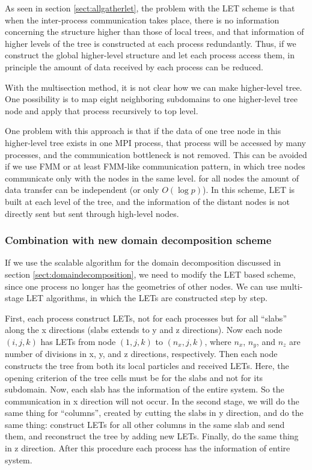 As seen in section \ref{sect:allgatherlet}, the problem with the
LET scheme is that when the inter-process communication takes place,
there is no information concerning the structure higher than those of
local trees, and that information of higher levels of the tree  is
constructed at each process redundantly. Thus, if we construct the
global higher-level structure and let each process access them, in
principle the amount of data received by each process can be reduced.

With the multisection method, it is not clear how we can make
higher-level tree. One possibility is to map eight neighboring
subdomains to one higher-level tree node and apply that process
recursively to top level.

One problem with this approach is that if the data of one tree node in
this higher-level tree exists in one MPI process, that process will be
accessed by many processes, and the communication bottleneck is not
removed. This can be avoided if we use FMM or at least FMM-like
communication pattern, in which tree nodes communicate only with the
nodes in the same level.  for all nodes the amount of data transfer
can be independent (or only $O(\log p)$). In this scheme, LET is built
at each level of the tree, and the information of the distant nodes is
not directly sent but sent through high-level nodes.

\subsubsection{Combination with new domain decomposition scheme}
\label{sect:localizedlet}
If we use the scalable algorithm for the domain decomposition
discussed in section \ref{sect:domaindecomposition},
we need to modify the LET based scheme, since one process no longer
has the geometries of other nodes. We can use multi-stage LET
algorithms, in which the LETs are constructed step by step.


First, each process construct LETs, not for each processes but for all
``slabs'' along the x directions (slabs  extends to y and z
directions). Now each node $(i,j,k)$ has LETs from node $(1, j, k)$ to
$(n_x, j, k)$, where $n_x$, $n_y$, and $n_z$ are number of divisions
in x, y, and z directions, respectively. Then each node constructs the
tree from both its local particles and received LETs. Here, the
opening criterion of the tree cells must be for the slabs and not for
its subdomain.   Now, each slab has the
information of the entire system. So the communication in x direction
will not occur. In the second stage,
we will do the same thing for ``columns'', created by cutting the
slabs in y direction, and do the same thing: construct LETs for all
other columns in the same slab and send them, and reconstruct the tree
by adding new LETs. Finally, do the same thing in z direction. After
this procedure each process has the information of entire system.

